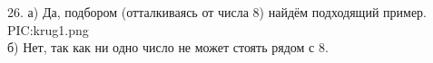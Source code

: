 26. а) Да, подбором (отталкиваясь от числа 8) найдём подходящий пример.
{{PIC:krug1.png}}\\
б) Нет, так как ни одно число не может стоять рядом с 8.\\
